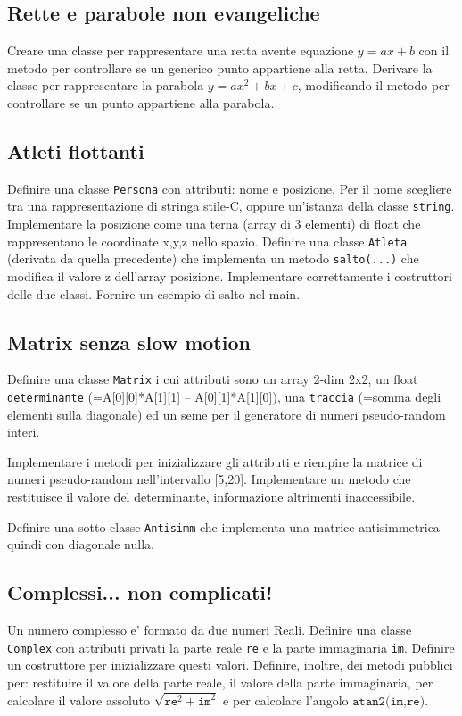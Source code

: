 \documentclass{article}
\begin{document}
\subsection{Rette e parabole non evangeliche}
Creare una classe per rappresentare una retta avente equazione $y = ax + b$ con il metodo per controllare se un generico punto appartiene alla retta. Derivare la classe per rappresentare la parabola $y = ax^2 + bx + c$, modificando il metodo per controllare se un punto appartiene alla parabola.


\subsection{Atleti flottanti}
Definire una classe \texttt{Persona} con attributi: nome e posizione. Per il nome scegliere tra una rappresentazione di stringa stile-C, oppure un'istanza della classe \texttt{string}. Implementare la posizione come una terna (array di 3 elementi) di float che rappresentano le coordinate x,y,z nello spazio. Definire una classe \texttt{Atleta} (derivata da quella precedente) che implementa un metodo \texttt{salto(...)} che modifica il valore z dell'array posizione. Implementare correttamente i costruttori delle due classi. Fornire un esempio di salto nel main.

\subsection{Matrix senza slow motion}
Definire una classe \texttt{Matrix} i cui attributi sono un array 2-dim 2x2, un float \texttt{determinante} (=A[0][0]*A[1][1] – A[0][1]*A[1][0]), una \texttt{traccia} (=somma degli elementi sulla diagonale) ed un seme per il generatore di numeri pseudo-random interi. 

Implementare i metodi per inizializzare gli attributi e riempire la matrice di numeri pseudo-random nell’intervallo [5,20]. Implementare un metodo che restituisce il valore del determinante, informazione altrimenti inaccessibile.

Definire una sotto-classe \texttt{Antisimm} che implementa una matrice antisimmetrica quindi con diagonale nulla.


\subsection{Complessi... non complicati!}
Un numero complesso e' formato da due numeri Reali. Definire una classe \texttt{Complex} con attributi privati la parte reale \texttt{re} e la parte immaginaria \texttt{im}. Definire un costruttore per inizializzare questi valori. Definire, inoltre, dei metodi pubblici per: restituire il valore della parte reale, il valore della parte immaginaria, per calcolare il valore assoluto $\sqrt{\texttt{re}^2 + \texttt{im}^2}$ e per calcolare l'angolo $\texttt{atan2(im,re)}$.
\end{document}

